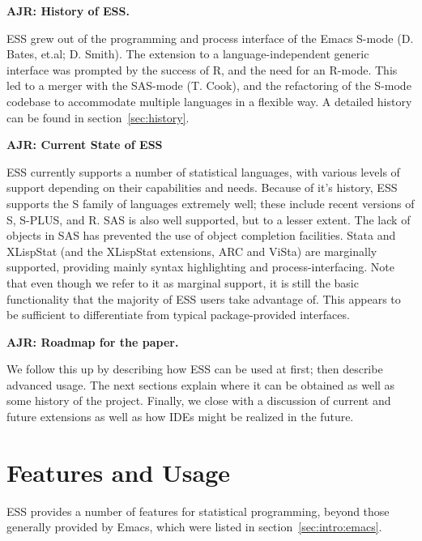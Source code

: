 \documentclass{article}
\begin{document}
\textbf{AJR: History of ESS.}

ESS grew out of the programming and process interface of the Emacs
S-mode (D. Bates, et.al; D. Smith).  The extension to a
language-independent generic interface was prompted by the success of
R, and the need for an R-mode.  This led to a merger with the SAS-mode
(T. Cook), and the refactoring of the S-mode codebase to accommodate
multiple languages in a flexible way.  A detailed  history can be
found in section~\ref{sec:history}.

\textbf{AJR: Current State of ESS}

ESS currently supports a number of statistical languages, with various
levels of support depending on their capabilities and needs.  Because
of it's history, ESS supports the S family of languages extremely
well; these include recent versions of S, S-PLUS, and R.  SAS is also
well supported, but to a lesser extent.  The lack of objects in SAS
has prevented the use of object completion facilities.  Stata and
XLispStat (and the XLispStat extensions, ARC and ViSta) are marginally
supported, providing mainly syntax highlighting and
process-interfacing.  Note that even though we refer to it as marginal
support, it is still the basic functionality that the majority of ESS
users take advantage of.  This appears to be sufficient to
differentiate from typical package-provided interfaces.

\textbf{AJR: Roadmap for the paper.}

We follow this up by describing how ESS can be used at first; then
describe advanced usage.  The next sections explain where it can be
obtained as well as some history of the project.  Finally, we close
with a discussion of current and future extensions as well as how IDEs
might be realized in the future.

\section{Features and Usage}
\label{sec:basic}

ESS provides a number of features for statistical programming, beyond
those generally provided by Emacs, which were listed in
section~\ref{sec:intro:emacs}.
\end{document}
